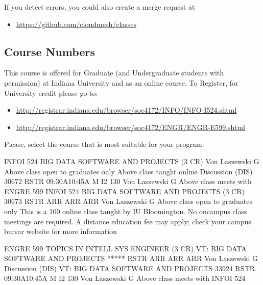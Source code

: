 If you detect errors, you could also create a merge request at
\begin{itemize}
\item {} 
\url{https://github.com/cloudmesh/classes}

\end{itemize}


\subsection{Course Numbers}
\label{\detokenize{i524/index:course-numbers}}
This course is offered for Graduate (and Undergraduate students with
permission) at Indiana University and as an online course. To
Register, for University credit please go to:
\begin{itemize}
\item {} 
\url{http://registrar.indiana.edu/browser/soc4172/INFO/INFO-I524.shtml}

\item {} 
\url{http://registrar.indiana.edu/browser/soc4172/ENGR/ENGR-E599.shtml}

\end{itemize}

Please, select the course that is most suitable for your program:

\begin{sphinxVerbatim}[commandchars=\\\{\}]
INFO\PYGZhy{}I 524  BIG DATA SOFTWARE AND PROJECTS (3 CR)    Von Laszewski G
         Above class open to graduates only
         Above class taught online
         Discussion (DIS)
      30672 RSTR     09:30A\PYGZhy{}10:45A   M      I2 130    Von Laszewski G
         Above class meets with ENGR\PYGZhy{}E 599
INFO\PYGZhy{}I 524  BIG DATA SOFTWARE AND PROJECTS (3 CR)
      30673 RSTR     ARR             ARR    ARR       Von Laszewski G
         Above class open to graduates only
         This is a 100\PYGZpc{} online class taught by IU Bloomington. No
         on\PYGZhy{}campus class meetings are required. A distance education
         fee may apply; check your campus bursar website for more
         information

 ENGR\PYGZhy{}E 599  TOPICS IN INTELL SYS ENGINEER (3 CR)
       VT: BIG DATA SOFTWARE AND PROJECTS
          ***** RSTR     ARR             ARR    ARR       Von Laszewski G
             Discussion (DIS)
       VT: BIG DATA SOFTWARE AND PROJECTS
          33924 RSTR     09:30A\PYGZhy{}10:45A   M      I2 130    Von Laszewski G
             Above class meets with INFO\PYGZhy{}I 524
\end{sphinxVerbatim}


